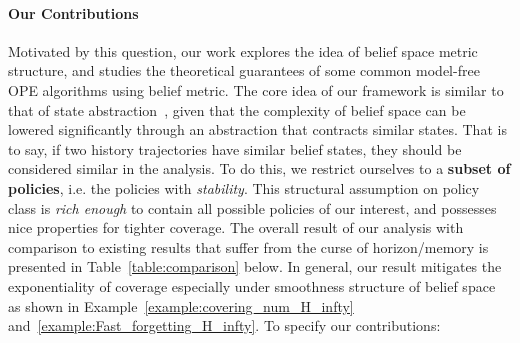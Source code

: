 \documentclass[twoside]{article}
\newcommand{\zyh}[1]{{\color{blue}{ [\textbf{Youheng:}} #1]}}
\begin{document}
\paragraph{Our Contributions}
Motivated by this question, our work explores the idea of belief space metric structure, and studies the theoretical guarantees of some common model-free OPE algorithms using belief metric. The core idea of our framework is similar to that of state abstraction~\cite{li2006towards_abstraction}, given that the complexity of belief space can be lowered significantly through an abstraction that contracts similar states. That is to say, if two history trajectories have similar belief states, they should be considered similar in the analysis.
To do this, we restrict ourselves to a \textbf{subset of policies}, i.e. the policies with \emph{stability}. This structural assumption on policy class is \emph{rich enough} to contain all possible policies of our interest, and possesses nice properties for tighter coverage.
The overall result of our analysis with comparison to existing results that suffer from the curse of horizon/memory is presented in Table~\ref{table:comparison} below. In general, our result mitigates the exponentiality of coverage especially under smoothness structure of belief space as shown in Example~\ref{example:covering_num_H_infty} and~\ref{example:Fast_forgetting_H_infty}. 
  To specify our contributions:
\end{document}
